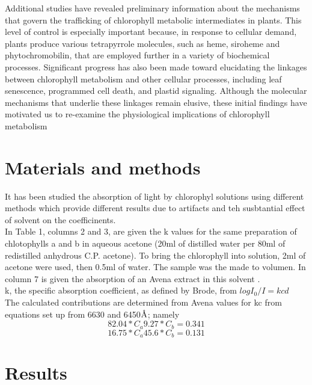 \documentclass[a4paper, 11pt]{article}
\begin{document}
	Additional studies have revealed preliminary information about the mechanisms that govern the trafficking of chlorophyll metabolic intermediates in plants. This level of control is especially important because, in response to cellular demand, plants produce various tetrapyrrole molecules, such as heme, siroheme and phytochromobilin, that are employed further in a variety of biochemical processes. Significant progress has also been made toward elucidating the linkages between chlorophyll metabolism and other cellular processes, including leaf senescence, programmed cell death, and plastid signaling. Although the molecular mechanisms that underlie these linkages remain elusive, these initial findings have motivated us to re-examine the physiological implications of chlorophyll metabolism \cite{Tanaka2006}

\section{Materials and methods}
	It has been studied the absorption of light by chlorophyl solutions using different methods which provide different results due to artifacts and teh susbtantial effect of solvent on the coefficinents. \\
	
	In Table 1, columns 2 and 3, are given the k values for the same preparation of chlotophylls a and b in aqueous acetone (20ml of distilled water per 80ml of redistilled anhydrous C.P. acetone). To bring the chlorophyll into solution, 2ml of acetone were used, then 0.5ml of water. The sample was the made to volumen. In column 7 is given the absorption of an Avena extract in this solvent \cite{Mackinney}.\\
	
	k, the specific absorption coefficient, as defined by Brode\cite{Brodc1939}, from $logI_0/I=kcd$\\
	
	The calculated contributions are determined from Avena values for kc from equations set up from 6630 and 6450$\textup{\r{A}}$; namely
	\begin{equation}
	82.04*C_a9.27*C_b=0.341
	\end{equation}
	\begin{equation}
	16.75*C_a45.6*C_b=0.131
	\end{equation}
	\cite{Mackinney}
	

\section{Results}
	
\end{document}
